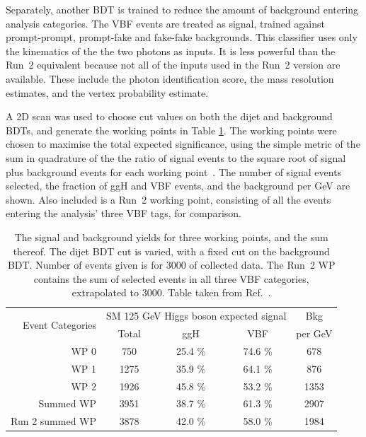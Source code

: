 Separately, another BDT is trained to reduce the amount of background entering analysis categories.
The VBF events are treated as signal, trained against prompt-prompt, 
prompt-fake and fake-fake \Hgg backgrounds.
This classifier uses only the kinematics of the the two photons as inputs. 
It is less powerful than the Run~2 equivalent 
because not all of the inputs used in the Run~2 version are available.
These include the photon identification score, 
the mass resolution estimates, and the vertex probability estimate.

A 2D scan was used to choose cut values on both the dijet and background BDTs, 
and generate the working points in Table \ref{tab:hgcal_yields}.
The working points were chosen to maximise the total expected significance, 
using the simple metric of the sum in quadrature of the 
the ratio of signal events to the square root of signal plus background events
for each working point~\cite{Asymptotic}.
The number of signal events selected, the fraction of ggH and VBF events, 
and the background per GeV are shown.
Also included is a Run~2 working point, 
consisting of all the events entering the analysis' three VBF tags, for comparison.

\begin{table}
  \centering
  \begin{tabular}{ r | c |  c |  c |  c }
  \multirow{2}{*}{Event Categories} &\multicolumn{3}{c|}{SM 125 GeV Higgs boson expected signal} & Bkg \\
    &  Total & ggH & VBF & per GeV \\
  \hline
  WP 0 &            750   &  25.4 \%  &  74.6 \%  &  678  \\
  WP 1 &            1275  &  35.9 \%  &  64.1 \%  &  876  \\
  WP 2 &            1926  &  45.8 \%  &  53.2 \%  &  1353 \\
  Summed WP &       3951  &  38.7 \%  &  61.3 \%  &  2907 \\
  Run 2 summed WP & 3878  &  42.0 \%  &  58.0 \%  &  1984 \\
  \end{tabular}
  \caption{The signal and background yields for three working points, and the sum thereof.
  The dijet BDT cut is varied, with a fixed cut on the background BDT.
  Number of events given is for \SI{3000}{\fbinv} of collected data. 
  The Run~2 WP contains the sum of selected events in all three VBF categories, extrapolated to \SI{3000}{\fbinv}.
  Table taken from Ref.~\cite{HGCAL}.}
  \label{tab:hgcal_yields}
\end{table}


